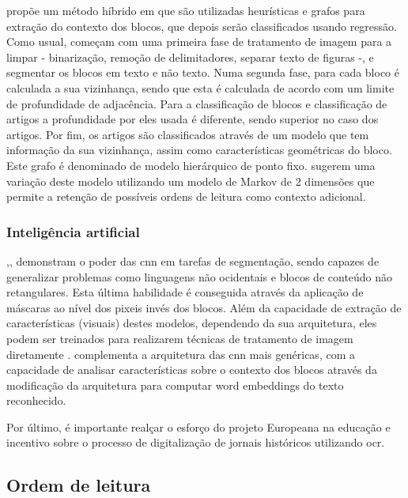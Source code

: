 \hspace{10pt}

\cite{6831009} propõe um método híbrido em que são utilizadas heurísticas e grafos para extração do contexto dos blocos, que depois serão classificados usando regressão. Como usual, começam com uma primeira fase de tratamento de imagem para a limpar - binarização, remoção de delimitadores, separar texto de figuras -, e segmentar os blocos em texto e não texto. Numa segunda fase, para cada bloco é calculada a sua vizinhança, sendo que esta é calculada de acordo com um limite de profundidade de adjacência. Para a classificação de blocos e classificação de artigos a profundidade por eles usada é diferente, sendo superior no caso dos artigos. Por fim, os artigos são classificados através de um modelo que tem informação da sua vizinhança, assim como características geométricas do bloco.
Este grafo é denominado de modelo hierárquico de ponto fixo. \cite{8300390} sugerem uma variação deste modelo utilizando um modelo de Markov de 2 dimensões que permite a retenção de possíveis ordens de leitura como contexto adicional.


\subsubsection{Inteligência artificial}

\cite{8999273},\cite{8270006},\cite{Barman_2021} demonstram o poder das \acrshort{cnn} em tarefas de segmentação, sendo capazes de generalizar problemas como linguagens não ocidentais e blocos de conteúdo não retangulares. Esta última habilidade é conseguida através da aplicação de máscaras ao nível dos pixeis invés dos blocos. Além da capacidade de extração de características (visuais) destes modelos, dependendo da sua arquitetura, eles podem ser treinados para realizarem técnicas de tratamento de imagem diretamente \citep{8270006}. \cite{Barman_2021} complementa a arquitetura das \acrshort{cnn} mais genéricas, com a capacidade de analisar características sobre o contexto dos blocos através da modificação da arquitetura para computar \gls{word embeddings} do texto reconhecido.

\hspace{10pt}

Por último, é importante realçar o esforço do projeto Europeana \citep{europeana_pro} na educação e incentivo sobre o processo de digitalização de jornais históricos utilizando \acrshort{ocr}.


\subsection{Ordem de leitura}
\label{sec_ordem_leitura}

